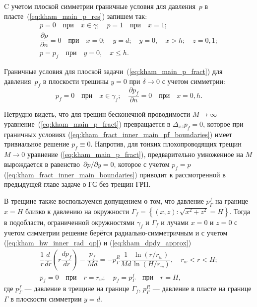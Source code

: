 \documentclass{article}
\newcommand{\mysub}[1]{%
  \par\vspace{0.5em}\noindent{\normalsize\underline{#1}}\par\vspace{0.5em}%
}
\begin{document}
C учетом плоской симметрии граничные условия для давления~$p$ в пласте~(\ref{eq:kham_main_p_res}) запишем так:
\begin{equation}
	\displaystyle
	\begin{gathered}
		p = 0 \quad \text{при} \quad x \in \gamma; \quad p=1 \quad \text{при} \quad x = 1; \\
		\dfrac{\partial p}{\partial n} = 0 \quad \text{при} \quad x=0; \quad
		y = d; \quad y = 0, \quad x > h; \quad z = 0,1; \\
		p = p_f \quad \text{при} \quad y = 0, \quad x \leq h.
	\end{gathered}
	\label{eq:kham_fract_inner_main_boundaries}
\end{equation}

Граничные условия для плоской задачи~(\ref{eq:kham_main_p_fract}) для давления~$p_f$ в
плоскости трещины $y=0$ при $\delta \to 0$ с учетом симметрии:
\begin{equation}
	\displaystyle
	p_f = 0 \quad \text{при} \quad x \in \gamma_f; \quad \dfrac{\partial p_f}{\partial n} = 0 \quad \text{при} \quad x=0, h.
	\label{eq:kham_fract_inner_main_pf_boundaries}
\end{equation}

Нетрудно видеть, что для трещин бесконечной проводимости $M \to \infty$ уравнение~(\ref{eq:kham_main_p_fract})
превращается в $\Delta_{xz} p_f = 0$, которое при граничных
условиях (\ref{eq:kham_fract_inner_main_pf_boundaries}) имеет тривиальное решение $p_f \equiv 0$.
Напротив, для тонких плохопроводящих трещин $M \to 0$ уравнение (\ref{eq:kham_main_p_fract}),
предварительно умноженное на $M$ вырождается в равенство~$\partial p/\partial y = 0$, которое
с учетом $p_f = p$ (\ref{eq:kham_fract_inner_main_boundaries}) приводит к рассмотренной в
предыдущей главе задаче о ГС без трещин ГРП.

\mysub{Подобласть (I) $r_w \leq x < H$}
В трещине также воспользуемся допущением о том, что давление $p^f_{\Gamma}$ на
границе $x=H$ близко к давлению на окружности $\Gamma_f=\left\{\left(x,z\right): \sqrt{x^2 + z^2} = H \right\}$. %
Тогда в подобласти, ограниченной окружностями $\gamma_f$ и $\Gamma_f$ и лучами $x=0$ и $z=0$
с учетом симметрии решение берётся радиально-симметричным и с учетом (\ref{eq:kham_hw_inner_rad_qp}) и (\ref{eq:kham_dpdy_approx})
\begin{equation}
	\displaystyle
	\begin{gathered}
		\dfrac{1}{r}\dfrac{d}{dr}\left(r\dfrac{d p_f}{dr}\right) - \dfrac{p_f}{Md} =
		- p^R_{\Gamma}\dfrac{1}{Md} \dfrac{\ln{\left(r/r_w\right)}}{\ln{\left(H/r_w\right)}}, \quad r_w < r < H;    \\[8pt]
		p_f = 0 \quad \text{при} \quad r = r_w; \quad p_f = p^f_{\Gamma} \quad \text{при} \quad r = H,
	\end{gathered}
	\label{eq:kham_fract_inner_area_I_press_equation}
\end{equation}
где $p^f_{\Gamma}$ — давление в трещине на границе $\Gamma_f$, $p^R_{\Gamma}$ — давление в
пласте на границе $\Gamma$ в плоскости симметрии $y=d$.
\end{document}
